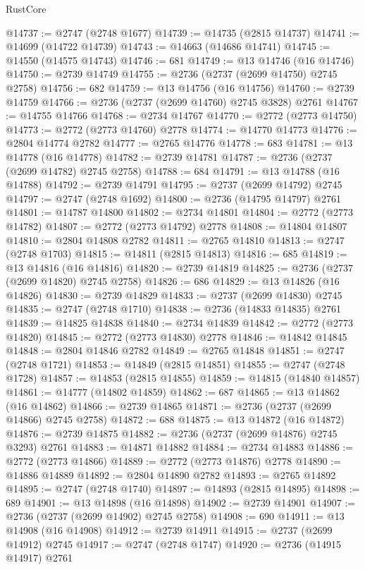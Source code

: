 \begin{lexlean}{RustCore}
\begin{coremodule}
@14737 := @2747 (@2748 @1677)
@14739 := @14735 (@2815 @14737)
@14741 := @14699 (@14722 @14739)
@14743 := @14663 (@14686 @14741)
@14745 := @14550 (@14575 @14743)
@14746 := 681
@14749 := @13 @14746 (@16 @14746)
@14750 := @2739 @14749
@14755 := @2736 (@2737 (@2699 @14750) @2745 @2758)
@14756 := 682
@14759 := @13 @14756 (@16 @14756)
@14760 := @2739 @14759
@14766 := @2736 (@2737 (@2699 @14760) @2745 @3828) @2761
@14767 := @14755 @14766
@14768 := @2734 @14767
@14770 := @2772 (@2773 @14750)
@14773 := @2772 (@2773 @14760) @2778
@14774 := @14770 @14773
@14776 := @2804 @14774 @2782
@14777 := @2765 @14776
@14778 := 683
@14781 := @13 @14778 (@16 @14778)
@14782 := @2739 @14781
@14787 := @2736 (@2737 (@2699 @14782) @2745 @2758)
@14788 := 684
@14791 := @13 @14788 (@16 @14788)
@14792 := @2739 @14791
@14795 := @2737 (@2699 @14792) @2745
@14797 := @2747 (@2748 @1692)
@14800 := @2736 (@14795 @14797) @2761
@14801 := @14787 @14800
@14802 := @2734 @14801
@14804 := @2772 (@2773 @14782)
@14807 := @2772 (@2773 @14792) @2778
@14808 := @14804 @14807
@14810 := @2804 @14808 @2782
@14811 := @2765 @14810
@14813 := @2747 (@2748 @1703)
@14815 := @14811 (@2815 @14813)
@14816 := 685
@14819 := @13 @14816 (@16 @14816)
@14820 := @2739 @14819
@14825 := @2736 (@2737 (@2699 @14820) @2745 @2758)
@14826 := 686
@14829 := @13 @14826 (@16 @14826)
@14830 := @2739 @14829
@14833 := @2737 (@2699 @14830) @2745
@14835 := @2747 (@2748 @1710)
@14838 := @2736 (@14833 @14835) @2761
@14839 := @14825 @14838
@14840 := @2734 @14839
@14842 := @2772 (@2773 @14820)
@14845 := @2772 (@2773 @14830) @2778
@14846 := @14842 @14845
@14848 := @2804 @14846 @2782
@14849 := @2765 @14848
@14851 := @2747 (@2748 @1721)
@14853 := @14849 (@2815 @14851)
@14855 := @2747 (@2748 @1728)
@14857 := @14853 (@2815 @14855)
@14859 := @14815 (@14840 @14857)
@14861 := @14777 (@14802 @14859)
@14862 := 687
@14865 := @13 @14862 (@16 @14862)
@14866 := @2739 @14865
@14871 := @2736 (@2737 (@2699 @14866) @2745 @2758)
@14872 := 688
@14875 := @13 @14872 (@16 @14872)
@14876 := @2739 @14875
@14882 := @2736 (@2737 (@2699 @14876) @2745 @3293) @2761
@14883 := @14871 @14882
@14884 := @2734 @14883
@14886 := @2772 (@2773 @14866)
@14889 := @2772 (@2773 @14876) @2778
@14890 := @14886 @14889
@14892 := @2804 @14890 @2782
@14893 := @2765 @14892
@14895 := @2747 (@2748 @1740)
@14897 := @14893 (@2815 @14895)
@14898 := 689
@14901 := @13 @14898 (@16 @14898)
@14902 := @2739 @14901
@14907 := @2736 (@2737 (@2699 @14902) @2745 @2758)
@14908 := 690
@14911 := @13 @14908 (@16 @14908)
@14912 := @2739 @14911
@14915 := @2737 (@2699 @14912) @2745
@14917 := @2747 (@2748 @1747)
@14920 := @2736 (@14915 @14917) @2761

\end{coremodule}
\end{lexlean}
